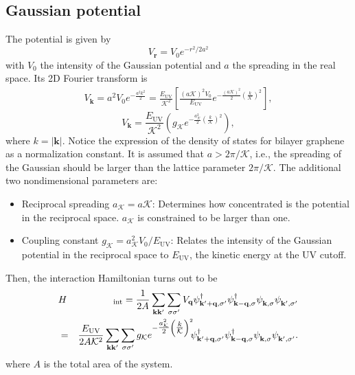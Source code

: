 \documentclass[english,aps,prd,nofootinbib,twocolumn]{revtex4-1}
\begin{document}
\subsection{Gaussian potential}
\label{sect:Potentials-Gaussian}
The potential is given by
\begin{equation}
V_{\mathbf{r}} = 
V_{0}e^{-r^{2}/2a^{2}}
\end{equation}
with $V_{0}$ the intensity of the Gaussian potential and $a$ the spreading in the real space. Its 2D Fourier transform is
\begin{eqnarray*}
\nonumber	
V_{\mathbf{k}}\! =\! a^{2}V_{0}
e^{-\tfrac{a^{2}k^{2}}{2}}\!
=\! \frac{E_{\mathrm{UV}}}{\mathcal{K}^{2}} 
\left[ \frac{(a\mathcal{K})^{2}V_{0}}{E_{\mathrm{UV}}}
e^{-\tfrac{(a{\mathcal{K}})^{2}}{2}
\left( \tfrac{k}{\mathcal{K}} \right)^{2}}
\right],	
\end{eqnarray*}
\vspace{-.5cm}
\begin{equation}
\label{eq:Fourier-Potential}
V_{\mathbf{k}} = \frac{E_{\mathrm{UV}}}{\mathcal{K}^{2}} 
\left( g_{\mathcal{K} } 
e^{-\tfrac{a_{\mathcal{K}}^{2}}{2}
\left( \tfrac{k}{\mathcal{K}} \right)^{2}}
\right),	
\end{equation}
where $k=|\mathbf{k}|$. Notice the expression of the density of states for bilayer graphene as a normalization constant. It is assumed that $a>2\pi/\mathcal{K}$, i.e., the spreading of the Gaussian should be larger than the lattice parameter $2\pi/\mathcal{K}$. The additional two nondimensional parameters are:
\begin{itemize}
\item Reciprocal spreading $a_{\mathcal{K}} = a\mathcal{K}$: Determines how concentrated is the potential in the reciprocal space. $a_{\mathcal{K}}$ is constrained to be larger than one.
\item Coupling constant $g_{\mathcal{K}} = a_{\mathcal{K}}^{2}V_{0}/E_{\mathrm{UV}}$: Relates the intensity of the Gaussian potential in the reciprocal space to $E_{\mathrm{UV}}$, the kinetic energy at the UV cutoff. 
\end{itemize}
Then, the interaction Hamiltonian turns out to be
\begin{eqnarray}
&H&\!_{\mathrm{int}} =
\frac{1}{2A}
\sum_{\mathbf{k }\mathbf{k'}}
\sum_{\sigma \sigma'} 
V_{\mathbf{q}}
\psi_{\mathbf{k'+q,\sigma'}}^{\textcolor{black}{\dagger}}
\psi_{\mathbf{k -q,\sigma }}^{\textcolor{black}{\dagger}}
\psi_{\mathbf{k   ,\sigma }}^{\textcolor{white}{\dagger}}
\psi_{\mathbf{k'  ,\sigma'}}^{\textcolor{white}{\dagger}} \\
 &=& \nonumber \frac{E_{\mathrm{UV}}}{2A\mathcal{K}^{2}}
\sum_{\mathbf{k }\mathbf{k'}}
\sum_{\sigma \sigma'} 
g_{\mathcal{K}}
e^{-\tfrac{a_{\mathcal{K}}^{2}}{2}\left( \tfrac{k}{\mathcal{K}} \right)^{2}}
\!\! 
\psi_{\mathbf{k'+q,\sigma'}}^{\textcolor{black}{\dagger}}
\psi_{\mathbf{k -q,\sigma }}^{\textcolor{black}{\dagger}}
\psi_{\mathbf{k   ,\sigma }}^{\textcolor{white}{\dagger}}
\psi_{\mathbf{k'  ,\sigma'}}^{\textcolor{white}{\dagger}}.
\end{eqnarray}
where $A$ is the total area of the system.
\end{document}
